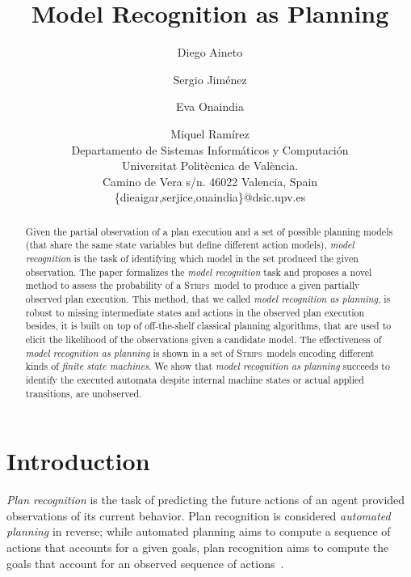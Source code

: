 \documentclass[letterpaper]{article} %
\newcommand{\strips}{\textsc{Strips}}     %
\begin{document}
\title{Model Recognition as Planning}

\author{Diego Aineto\and Sergio Jim\'enez\and Eva Onaindia \and Miquel Ram\'irez\\
{\small Departamento de Sistemas Inform\'aticos y Computaci\'on}\\
{\small Universitat Polit\`ecnica de Val\`encia.}\\
{\small Camino de Vera s/n. 46022 Valencia, Spain}\\
{\small \{dieaigar,serjice,onaindia\}@dsic.upv.es}}



\maketitle
\begin{abstract} 
Given the partial observation of a plan execution and a set of possible planning models (that share the same state variables but define different action models), {\em model recognition} is the task of identifying which model in the set produced the given observation. The paper formalizes the {\em model recognition} task and proposes a novel method to assess the probability of a \strips\ model to produce a given partially observed plan execution. This method, that we called {\em model recognition as planning}, is robust to missing intermediate states and actions in the observed plan execution besides, it is built on top of off-the-shelf classical planning algorithms, that are used to elicit the likelihood of the observations given a candidate model. The effectiveness of {\em model recognition as planning} is shown in a set of \strips\ models encoding different kinds of {\em finite state machines}. We show that {\em model recognition as planning} succeeds to identify the executed automata despite internal machine states or actual applied transitions, are unobserved.
\end{abstract}

\section{Introduction}
\label{sec:introduction}
{\em Plan recognition} is the task of predicting the future actions of an agent provided observations of its current behavior. Plan recognition is considered {\em automated planning} in reverse; while automated planning aims to compute a sequence of actions that accounts for a given goals, plan recognition aims to compute the goals that account for an observed sequence of actions~\cite{geffner:book:2013}.
\end{document}
